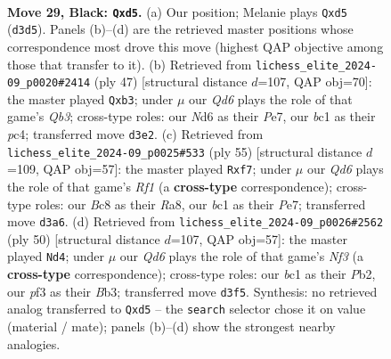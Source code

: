 \documentclass[11pt]{article}
\begin{document}
\begin{figure}[p]
\label{fig:thought-m55}
\end{figure}

\clearpage

\begin{figure}[p]\centering
\begin{subfigure}{0.46\textwidth}\centering
\resizebox{\linewidth}{!}{%
\newchessgame
\chessboard[
  setfen={r1b5/ppp2ppk/3n1b1p/3P4/B4Q2/3q1P1P/PP4P1/R1B3K1 b - - 5 29},
  showmover=false,
  pgfstyle=straightmove, color=movearrow, markmove={d3-d5}
]}
\caption{}
\end{subfigure}\hfill
\begin{subfigure}{0.46\textwidth}\centering
\resizebox{\linewidth}{!}{%
\newchessgame
\chessboard[
  setfen={1r4k1/1p2ppb1/1q4p1/p1p4p/P1P1Q1b1/1P4P1/4PPBP/2BR2K1 b - - 4 24},
  showmover=false,
  pgfstyle=straightmove, color=movearrow, markmove={b6-b3}
]}
\caption{}
\end{subfigure}
\\[4pt]
\begin{subfigure}{0.46\textwidth}\centering
\resizebox{\linewidth}{!}{%
\newchessgame
\chessboard[
  setfen={r4r1k/4pP1p/p1np4/1p2bPq1/4P3/2P4Q/PP2NKB1/R7 b - - 5 28},
  showmover=false,
  pgfstyle=straightmove, color=movearrow, markmove={f8-f7}
]}
\caption{}
\end{subfigure}\hfill
\begin{subfigure}{0.46\textwidth}\centering
\resizebox{\linewidth}{!}{%
\newchessgame
\chessboard[
  setfen={r1k1r3/1p3p2/pqb1p2p/4B1p1/P1Q5/1BP2N1P/1P3PP1/4R1K1 w - - 5 26},
  showmover=false,
  pgfstyle=straightmove, color=movearrow, markmove={f3-d4}
]}
\caption{}
\end{subfigure}
\caption{\textbf{Move 29, Black: \texttt{Qxd5}.} (a) Our position; Melanie plays \texttt{Qxd5} (\texttt{d3d5}). Panels (b)--(d) are the retrieved master positions whose correspondence most drove this move (highest QAP objective among those that transfer to it). (b) Retrieved from \texttt{lichess\_elite\_2024-09\_p0020\#2414} (ply 47) [structural distance $d$=107, QAP obj=70]: the master played \texttt{Qxb3}; under $\mu$ our \emph{Qd6} plays the role of that game's \emph{Qb3}; cross-type roles: our \emph{N}d6 as their \emph{P}e7, our \emph{b}c1 as their \emph{p}c4; transferred move \texttt{d3e2}. (c) Retrieved from \texttt{lichess\_elite\_2024-09\_p0025\#533} (ply 55) [structural distance $d$=109, QAP obj=57]: the master played \texttt{Rxf7}; under $\mu$ our \emph{Qd6} plays the role of that game's \emph{Rf1} (a \textbf{cross-type} correspondence); cross-type roles: our \emph{B}c8 as their \emph{R}a8, our \emph{b}c1 as their \emph{P}e7; transferred move \texttt{d3a6}. (d) Retrieved from \texttt{lichess\_elite\_2024-09\_p0026\#2562} (ply 50) [structural distance $d$=107, QAP obj=57]: the master played \texttt{Nd4}; under $\mu$ our \emph{Qd6} plays the role of that game's \emph{Nf3} (a \textbf{cross-type} correspondence); cross-type roles: our \emph{b}c1 as their \emph{P}b2, our \emph{p}f3 as their \emph{B}b3; transferred move \texttt{d3f5}. Synthesis: no retrieved analog transferred to \texttt{Qxd5} -- the \texttt{search} selector chose it on value (material / mate); panels (b)--(d) show the strongest nearby analogies.}

\end{figure}
\end{document}
